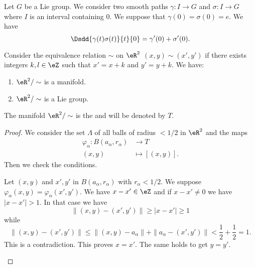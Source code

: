 \begin{proposition}     \label{PROPooAXYRooWVhXRa}
	Let \( G\) be a Lie group. We consider two smooth paths \( \gamma\colon I\to G\) and \( \sigma\colon I\to G\) where \( I\) is an interval containing \( 0\). We suppose that \( \gamma(0)=\sigma(0)=e\). We have
	\begin{equation}
		\Dsdd{ \gamma(t)\sigma(t) }{t}{0}=\gamma'(0)+\sigma'(0).
	\end{equation}
\end{proposition}

\begin{proposition}[\( 2\)-torus]       \label{PROPooSBVCooOZnszF}
	Consider the equivalence relation \( \sim\) on \( \eR^2\) \( (x,y)\sim(x',y')\) if there exists integers \( k,l\in \eZ\) such that \( x'=x+k\) and \( y'=y+k\). We have:
	\begin{enumerate}
		\item
		      \( \eR^2/\sim\) is a manifold.
		\item
		      \( \eR^2/\sim\) is a Lie group.
	\end{enumerate}
	The manifold \( \eR^2/\sim\) is the  and will be denoted by \( T\).
\end{proposition}

\begin{proof}
	We consider the set \( \Lambda\) of all balls of radius \( <1/2\) in \( \eR^2\) and the maps
	\begin{equation}
		\begin{aligned}
			\varphi_{\alpha}\colon B(a_{\alpha},r_{\alpha}) & \to T            \\
			(x,y)                                           & \mapsto [(x,y)].
		\end{aligned}
	\end{equation}
	Then we check the conditions.
	\begin{subproof}
		Let \( (x,y)\) and \( x',y'\) in \( B(a_{\alpha},r_{\alpha})\) with \( r_{\alpha}<1/2\). We suppose \( \varphi_{\alpha}(x,y)=\varphi_{\alpha}(x',y')\). We have \( x-x'\in \eZ\) and if \( x-x'\neq 0\) we have \( | x-x' |>1\). In that case we have
		\begin{equation}
			\| (x,y)-(x',y') \|\geq | x-x' |\geq 1
		\end{equation}
		while
		\begin{equation}
			\| (x,y)-(x',y') \|\leq \| (x,y)-a_{\alpha} \|+\| a_{\alpha}-(x',y') \|<\frac{ 1 }{2}+\frac{ 1 }{2}=1.
		\end{equation}
		This is a contradiction. This proves \( x=x'\). The same holds to get \( y=y'\).
	\end{subproof}
\end{proof}

